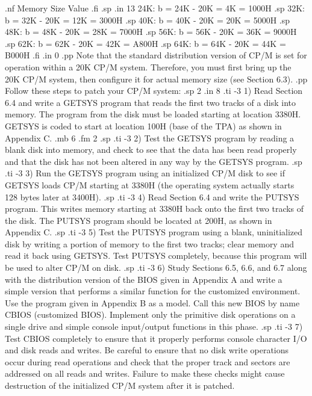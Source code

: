 .nf
          Memory Size                Value
.fi
.sp
.in 13
24K:         b = 24K - 20K =  4K = 1000H
.sp
32K:         b = 32K - 20K = 12K = 3000H
.sp
40K:         b = 40K - 20K = 20K = 5000H
.sp
48K:         b = 48K - 20K = 28K = 7000H
.sp
56K:         b = 56K - 20K = 36K = 9000H
.sp
62K:         b = 62K - 20K = 42K = A800H
.sp
64K:         b = 64K - 20K = 44K = B000H
.fi
.in 0
.pp
Note that the standard distribution version of CP/M is set for
operation within a 20K CP/M system. Therefore, you must first bring up
the 20K CP/M system, then configure it for actual 
memory size (see Section 6.3).
.pp
Follow these steps to patch your CP/M system:
.sp 2
.in 8
.ti -3
1) Read Section 6.4 and write a GETSYS program that reads the 
first two tracks of a disk into memory.  The program from the 
disk must be loaded starting at location 3380H.  GETSYS is coded 
to start at location 100H (base of the TPA) as shown in Appendix 
C.
.mb 6
.fm 2
.sp
.ti -3
2) Test the GETSYS program by reading a blank disk into memory, 
and check to see that the data has been read properly and that 
the disk has not been altered in any way by the GETSYS program.
.sp
.ti -3
3) Run the GETSYS program using an initialized CP/M disk to see 
if GETSYS loads CP/M starting at 3380H (the operating system 
actually starts 128 bytes later at 3400H).
.sp
.ti -3
4) Read Section 6.4 and write the PUTSYS program.  This writes 
memory starting at 3380H back onto the first two tracks of the 
disk.  The PUTSYS program should be located at 200H, as shown in 
Appendix C.
.sp
.ti -3
5) Test the PUTSYS program using a blank, uninitialized disk by 
writing a portion of memory to the first two tracks; clear memory 
and read it back using GETSYS.  Test PUTSYS completely, because 
this program will be used to alter CP/M on disk.
.sp
.ti -3
6) Study Sections 6.5, 6.6, and 6.7 along with the distribution 
version of the BIOS given in Appendix A and write a simple 
version that performs a similar function for the customized 
environment.  Use the program given in Appendix B as a model.  
Call this new BIOS by name CBIOS (customized BIOS).  Implement 
only the primitive disk operations on a single drive and simple 
console input/output functions in this phase.
.sp
.ti -3
7) Test CBIOS completely to ensure that it properly performs 
console character I/O and disk reads and writes.  Be careful to 
ensure that no disk write operations occur during read operations 
and check that the proper track and sectors are addressed on all 
reads and writes.  Failure to make these checks might cause 
destruction of the initialized CP/M system after it is patched.

